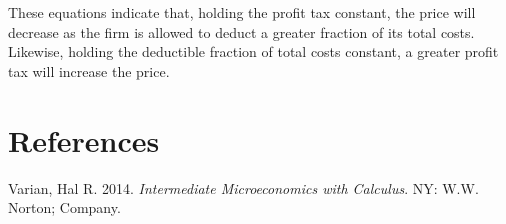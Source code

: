\documentclass[
]{article}
\newlength{\cslhangindent}
\newlength{\cslentryspacingunit} %
\newenvironment{CSLReferences}[2] %
 {%
  \setlength{\parindent}{0pt}
  \ifodd #1
  \let\oldpar\par
  \def\par{\hangindent=\cslhangindent\oldpar}
  \fi
  \setlength{\parskip}{#2\cslentryspacingunit}
 }%
 {}
\begin{document}
These equations indicate that, holding the profit tax constant, the
price will decrease as the firm is allowed to deduct a greater fraction
of its total costs. Likewise, holding the deductible fraction of total
costs constant, a greater profit tax will increase the price.

\hypertarget{references}{%
\section*{References}\label{references}}

\hypertarget{refs}{}
\begin{CSLReferences}{1}{0}
\leavevmode{}%
Varian, Hal R. 2014. \emph{Intermediate Microeconomics with Calculus}.
NY: W.W. Norton; Company.

\end{CSLReferences}
\end{document}
